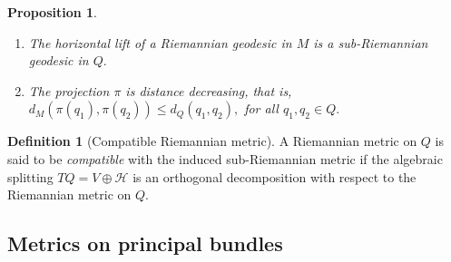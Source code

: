 \documentclass [xcolor=svgnames, t] {beamer}
\theoremstyle{definition}
\newtheorem{df}{Definition}
\theoremstyle{plain}
\newtheorem{prop}{Proposition}
\theoremstyle{remark}
\begin{document}
\begin{frame}[allowframebreaks]
\begin{prop}
\begin{enumerate}
		\item The horizontal lift of a Riemannian geodesic in $ M $ is a sub-Riemannian geodesic in $ Q. $ 
		\item The projection $ \pi $ is distance decreasing, that is, $ d_M(\pi(q_1), \pi(q_2))\leq d_Q(q_1,q_2), $ for all $ q_1,q_2\in Q. $ 
	\end{enumerate}
\end{prop}
\begin{df}[Compatible Riemannian metric]\label{df:compatible}
	A Riemannian metric on $ Q $ is said to be \textit{compatible} with the induced sub-Riemannian metric if the algebraic splitting $ TQ = V \oplus \mathcal{H} $ is an orthogonal decomposition with respect to the Riemannian metric on $ Q$.  
\end{df}
\end{frame}
\subsection{Metrics on principal bundles}%
\label{sub:metrics_on_principal_bundles}
\end{document}
